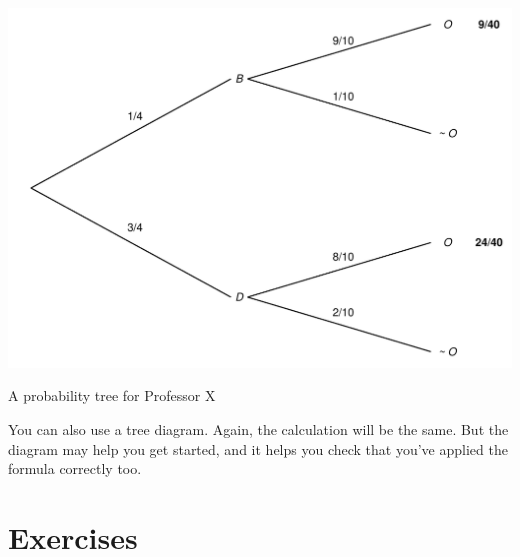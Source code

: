 \documentclass[justified]{tufte-book}
\theoremstyle{definition}
\theoremstyle{definition}
\theoremstyle{definition}
\theoremstyle{remark}
\begin{document}
\begin{marginfigure}
\includegraphics{_main_files/figure-latex/unnamed-chunk-76-5} \caption[A probability tree for Professor X]{A probability tree for Professor X}\label{fig:unnamed-chunk-76}
\end{marginfigure}

You can also use a tree diagram. Again, the calculation will be the same. But the diagram may help you get started, and it helps you check that you've applied the formula correctly too.

\hypertarget{exercises-5}{%
\section*{Exercises}\label{exercises-5}}
\end{document}
